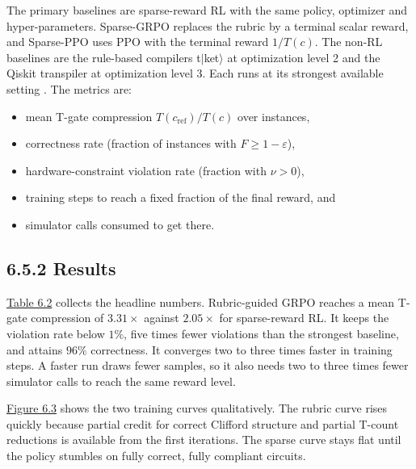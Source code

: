 \documentclass{report}
\theoremstyle{plain}
\theoremstyle{definition}
\theoremstyle{remark}
\newcommand{\eps}{\varepsilon}
\begin{document}
The primary baselines are sparse-reward RL with the same policy, optimizer and hyper-parameters. Sparse-GRPO replaces the rubric by a terminal scalar reward, and Sparse-PPO uses PPO with the terminal reward $1/T(c)$. The non-RL baselines are the rule-based compilers t$|$ket$\rangle$ at optimization level 2 and the Qiskit transpiler at optimization level 3. Each runs at its strongest available setting \cite{guo2026rubriq}. The metrics are:
\begin{itemize}
  \item mean T-gate compression $T(c_{\mathrm{ref}})/T(c)$ over instances,
  \item correctness rate (fraction of instances with $F\ge 1-\eps$),
  \item hardware-constraint violation rate (fraction with $\nu>0$),
  \item training steps to reach a fixed fraction of the final reward, and
  \item simulator calls consumed to get there.
\end{itemize}

\subsection{6.5.2 Results}\label{sec:syn:mainresults}

\hyperref[tab:syn:results]{Table 6.2} collects the headline numbers. Rubric-guided GRPO reaches a mean T-gate compression of $3.31\times$ against $2.05\times$ for sparse-reward RL. It keeps the violation rate below $1\%$, five times fewer violations than the strongest baseline, and attains $96\%$ correctness. It converges two to three times faster in training steps. A faster run draws fewer samples, so it also needs two to three times fewer simulator calls to reach the same reward level.

\hyperref[fig:syn:training]{Figure 6.3} shows the two training curves qualitatively. The rubric curve rises quickly because partial credit for correct Clifford structure and partial T-count reductions is available from the first iterations. The sparse curve stays flat until the policy stumbles on fully correct, fully compliant circuits.
\end{document}
